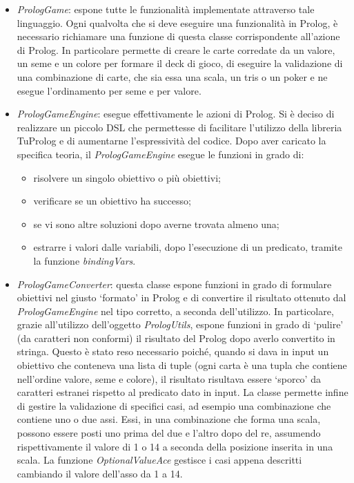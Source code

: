\begin{itemize}
    \item \textit{PrologGame}: espone tutte le funzionalità implementate attraverso tale linguaggio. Ogni qualvolta che si deve eseguire una funzionalità in Prolog, è necessario richiamare una funzione di questa classe corrispondente all’azione di Prolog.
    In particolare permette di creare le carte corredate da un valore, un seme e un colore per formare il deck di gioco, di eseguire la validazione di una combinazione di carte, che sia essa una scala, un tris o un poker e ne esegue l’ordinamento per seme e per valore.

    \item \textit{PrologGameEngine}: esegue effettivamente le azioni di Prolog.
    Si è deciso di realizzare un piccolo DSL che permettesse di facilitare l’utilizzo della libreria TuProlog e di aumentarne l’espressività del codice. Dopo aver caricato la specifica teoria, il \textit{PrologGameEngine} esegue le funzioni in grado di:
    \begin{itemize}
        \item risolvere un singolo obiettivo o più obiettivi;
        \item verificare se un obiettivo ha successo;
        \item se vi sono altre soluzioni dopo averne trovata almeno una;
        \item estrarre i valori dalle variabili, dopo l’esecuzione di un predicato, tramite la funzione \textit{bindingVars}.
    \end{itemize}

    \item \textit{PrologGameConverter}: questa classe espone funzioni in grado di formulare obiettivi nel giusto ‘formato’ in Prolog e di convertire il risultato ottenuto dal \textit{PrologGameEngine} nel tipo corretto, a seconda dell’utilizzo. In particolare, grazie all’utilizzo dell’oggetto \textit{PrologUtils}, espone funzioni in grado di ‘pulire’ (da caratteri non conformi) il risultato del Prolog dopo averlo convertito in stringa. Questo è stato reso necessario poiché, quando si dava in input un obiettivo che conteneva una lista di tuple (ogni carta è una tupla che contiene nell’ordine valore, seme e colore), il risultato risultava essere ‘sporco’ da caratteri estranei rispetto al predicato dato in input.
    La classe permette infine di gestire la validazione di specifici casi, ad esempio  una combinazione che contiene uno o due assi. Essi, in una combinazione che forma una scala, possono essere posti uno prima del due e l’altro dopo del re, assumendo rispettivamente il valore di 1 o 14 a seconda della posizione inserita in una scala. La funzione \textit{OptionalValueAce} gestisce i casi appena descritti cambiando il valore dell’asso da 1 a 14.
\end{itemize}

